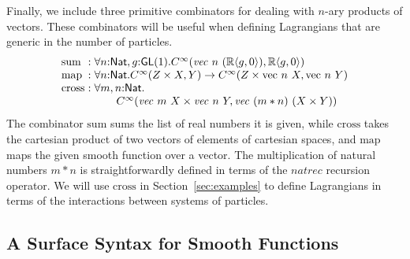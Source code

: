 \documentclass[preprint]{sigplanconf}
\theoremstyle{examplestyle}
\begin{document}
Finally, we include three primitive combinators for dealing with
$n$-ary products of vectors. These combinators will be useful when
defining Lagrangians that are generic in the number of particles.
\begin{displaymath}
  \begin{array}{l@{\hspace{0.3em}}c@{\hspace{0.3em}}l}
    \mathrm{sum} &:& \forall n \mathord: \mathsf{Nat}, g \mathord: \mathsf{GL}(1). C^\infty(\mathit{vec}~n~(\mathbb{R}\langle g, 0 \rangle), \mathbb{R}\langle g, 0\rangle) \\
    \mathrm{map} &:& \forall n \mathord: \mathsf{Nat}. C^\infty(Z \times X,Y) \to C^\infty(Z \times \mathrm{vec}~n~X, \mathrm{vec}~n~Y) \\
    \mathrm{cross} &:& 
    \begin{array}[t]{@{}l}
      \forall m,n \mathord: \mathsf{Nat}.\\
      \quad\quad C^\infty(\mathit{vec}~m~X \times \mathit{vec}~n~Y, \mathit{vec}~(m*n)~(X \times Y))
    \end{array}
  \end{array}
\end{displaymath}
The combinator $\mathrm{sum}$ sums the list of real numbers it is
given, while $\mathrm{cross}$ takes the cartesian product of two
vectors of elements of cartesian spaces, and $\mathrm{map}$ maps the
given smooth function over a vector. The multiplication of natural
numbers $m*n$ is straightforwardly defined in terms of the
$\mathit{natrec}$ recursion operator. We will use $\mathrm{cross}$ in
Section~\ref{sec:examples} to define Lagrangians in terms of the
interactions between systems of particles.

\subsection{A Surface Syntax for Smooth Functions}
\label{sec:surface-syntax}
\end{document}
